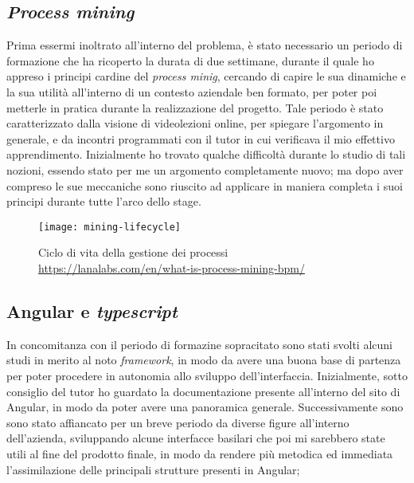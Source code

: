 \subsection{\textit{Process mining}}
Prima essermi inoltrato all'interno del problema, è stato necessario un periodo di formazione che ha ricoperto la durata di due settimane, durante il quale ho appreso i principi cardine del \textit{process minig}, cercando di capire le sua dinamiche e la sua utilità all'interno di un contesto aziendale ben formato, per poter poi metterle in pratica durante la realizzazione del progetto. Tale periodo è stato caratterizzato dalla visione di videolezioni online, per spiegare l'argomento in generale, e da incontri programmati con il tutor in cui verificava il mio effettivo apprendimento. Inizialmente ho trovato qualche difficoltà durante lo studio di tali nozioni, essendo stato per me un argomento completamente nuovo; ma dopo aver compreso le sue meccaniche sono riuscito ad applicare in maniera completa i suoi principi durante tutte l'arco dello stage.
\begin{figure}[!h] 
	\centering 
	\texttt{[image: mining-lifecycle]} 
	\caption{Ciclo di vita della gestione dei processi \url{https://lanalabs.com/en/what-is-process-mining-bpm/}}
\end{figure}

\subsection{Angular e \textit{typescript}}
In concomitanza con il periodo di formazine sopracitato sono stati svolti alcuni studi in merito al noto \textit{framework}, in modo da avere una buona base di partenza per poter procedere in autonomia allo sviluppo dell'interfaccia. Inizialmente, sotto consiglio del tutor ho guardato la documentazione presente all'interno del sito di Angular, in modo da poter avere una panoramica generale. Successivamente sono sono stato affiancato per un breve periodo da diverse figure all'interno dell'azienda, sviluppando alcune interfacce basilari che poi mi sarebbero state utili al fine del prodotto finale, in modo da rendere più metodica ed immediata l'assimilazione delle principali strutture presenti in Angular;
